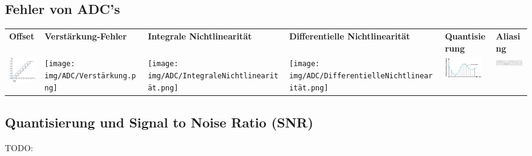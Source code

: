 \documentclass[margin=normal]{tex/hsrzf}
\begin{document}
\subsection{Fehler von ADC's}
\begin{tabularx}{\textwidth}{p{}p{}p{}p{}p{}p{}}
  \textbf{Offset}
   &
  \textbf{Verstärkung-\newline Fehler}
   &
  \textbf{Integrale \newline Nichtlinearität}
   &
  \textbf{Differentielle Nichtlinearität}
   &
  \textbf{Quantisierung}
   &
  \textbf{Aliasing}
  \\
  \includegraphics[width = 1.6cm]{img/ADC/OffsetFehler.png}
   &
  \texttt{[image: img/ADC/Verstärkung.png]}
   &
  \texttt{[image: img/ADC/IntegraleNichtlinearität.png]}
   &
  \texttt{[image: img/ADC/DifferentielleNichtlinearität.png]}
   &
  \includegraphics[width = 1.6cm]{img/ADC/Quantisierungsfehler.png}
   &
  \includegraphics[width = 1.6cm]{img/ADC/Aliasing.png}
\end{tabularx}

\subsection{Quantisierung und Signal to Noise Ratio (SNR)}
\huge TODO: %
\end{document}

